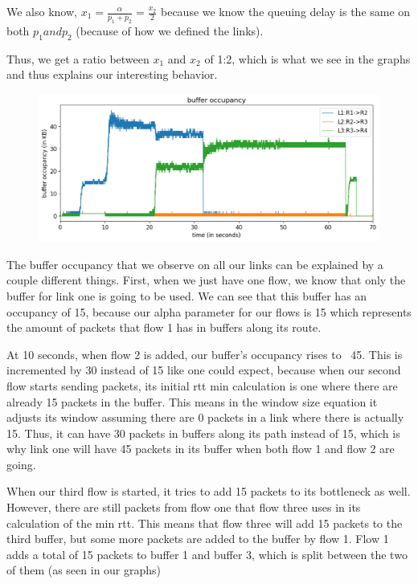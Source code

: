 \documentclass{article}
\begin{document}
We also know, $x_1 = \frac{\alpha}{p_1 + p_2} = \frac{x_2}{ 2}$ because we know the queuing delay is the same on both $p_1 and p_2$ (because of how we defined the links).

Thus, we get a ratio between $x_1$ and $x_2$ of 1:2, which is what we see in the graphs and thus explains our interesting behavior.

\begin{figure}[H]
\centering
\includegraphics[width = \textwidth]{"test_case2_fast buffer occupancy"}
\end{figure}

The buffer occupancy that we observe on all our links can be explained by a couple different things. First, when we just have one flow, we know that only the buffer for link one is going to be used. We can see that this buffer has an occupancy of 15, because our alpha parameter for our flows is 15 which represents the amount of packets that flow 1 has in buffers along its route. 

At 10 seconds, when flow 2 is added, our buffer's occupancy rises to ~45. This is incremented by 30 instead of 15 like one could expect, because when our second flow starts sending packets, its initial rtt min calculation is one where there are already 15 packets in the buffer. This means in the window size equation it adjusts its window assuming there are 0 packets in a link where there is actually 15. Thus, it can have 30 packets in buffers along its path instead of 15, which is why link one will have 45 packets in its buffer when both flow 1 and flow 2 are going.

When our third flow is started, it tries to add 15 packets to its bottleneck as well. However, there are still packets from flow one that flow three uses in its calculation of the min rtt. This means that flow three will add 15 packets to the third buffer, but some more packets are added to the buffer by flow 1. Flow 1 adds a total of 15 packets to buffer 1 and buffer 3, which is split between the two of them (as seen in our graphs)
\end{document}
